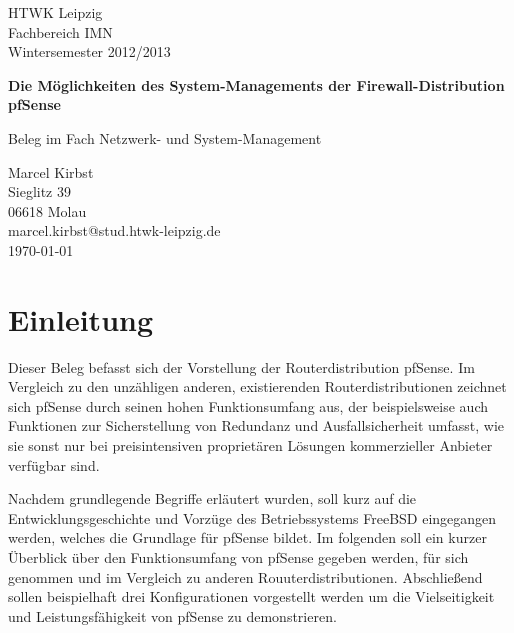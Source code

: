 \documentclass[a4paper,12pt]{scrartcl}
\begin{document}
\begin{titlepage}
\begin{small}
\vfill {HTWK Leipzig\\ 
Fachbereich IMN \\ 
Wintersemester 2012/2013}
\end{small}


\begin{center}
\begin{Large}
\vfill {\textsf{\textbf{
Die Möglichkeiten des System-Managements der Firewall-Distribution pfSense\\
}}}
\end{Large}
Beleg im Fach Netzwerk- und System-Management
\end{center}

\begin{small}
\vfill Marcel Kirbst \\ Sieglitz 39 \\  06618 Molau \\
marcel.kirbst@stud.htwk-leipzig.de\\
\today
\end{small}

\end{titlepage}


\tableofcontents
\thispagestyle{empty}

\clearpage

\onehalfspacing

\pagestyle{plain}


\section{Einleitung}
Dieser Beleg befasst sich der Vorstellung der Routerdistribution pfSense.
Im Vergleich zu den unzähligen anderen, existierenden Routerdistributionen
zeichnet sich pfSense durch seinen hohen Funktionsumfang aus, der beispielsweise
auch Funktionen zur Sicherstellung von Redundanz und Ausfallsicherheit umfasst,
wie sie sonst nur bei preisintensiven proprietären Lösungen kommerzieller
Anbieter verfügbar sind.


Nachdem grundlegende Begriffe erläutert wurden, soll kurz auf die
Entwicklungsgeschichte und Vorzüge des Betriebssystems FreeBSD eingegangen
werden, welches die Grundlage für pfSense bildet. Im folgenden soll ein kurzer
Überblick über den Funktionsumfang von pfSense gegeben werden, für sich genommen
und im Vergleich zu anderen Rouuterdistributionen. Abschließend sollen
beispielhaft drei Konfigurationen vorgestellt werden um die Vielseitigkeit und
Leistungsfähigkeit von pfSense zu demonstrieren.
\end{document}
